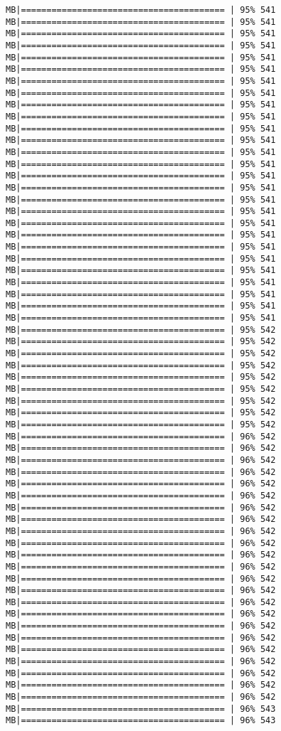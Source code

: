\documentclass[
]{article}
\begin{document}
\begin{verbatim}
MB|======================================== | 95% 541 MB|======================================== | 95% 541 MB|======================================== | 95% 541 MB|======================================== | 95% 541 MB|======================================== | 95% 541 MB|======================================== | 95% 541 MB|======================================== | 95% 541 MB|======================================== | 95% 541 MB|======================================== | 95% 541 MB|======================================== | 95% 541 MB|======================================== | 95% 541 MB|======================================== | 95% 541 MB|======================================== | 95% 541 MB|======================================== | 95% 541 MB|======================================== | 95% 541 MB|======================================== | 95% 541 MB|======================================== | 95% 541 MB|======================================== | 95% 541 MB|======================================== | 95% 541 MB|======================================== | 95% 541 MB|======================================== | 95% 541 MB|======================================== | 95% 541 MB|======================================== | 95% 541 MB|======================================== | 95% 541 MB|======================================== | 95% 541 MB|======================================== | 95% 541 MB|======================================== | 95% 541 MB|======================================== | 95% 542 MB|======================================== | 95% 542 MB|======================================== | 95% 542 MB|======================================== | 95% 542 MB|======================================== | 95% 542 MB|======================================== | 95% 542 MB|======================================== | 95% 542 MB|======================================== | 95% 542 MB|======================================== | 95% 542 MB|======================================== | 96% 542 MB|======================================== | 96% 542 MB|======================================== | 96% 542 MB|======================================== | 96% 542 MB|======================================== | 96% 542 MB|======================================== | 96% 542 MB|======================================== | 96% 542 MB|======================================== | 96% 542 MB|======================================== | 96% 542 MB|======================================== | 96% 542 MB|======================================== | 96% 542 MB|======================================== | 96% 542 MB|======================================== | 96% 542 MB|======================================== | 96% 542 MB|======================================== | 96% 542 MB|======================================== | 96% 542 MB|======================================== | 96% 542 MB|======================================== | 96% 542 MB|======================================== | 96% 542 MB|======================================== | 96% 542 MB|======================================== | 96% 542 MB|======================================== | 96% 542 MB|======================================== | 96% 542 MB|======================================== | 96% 543 MB|======================================== | 96% 543 
\end{verbatim}
\end{document}
